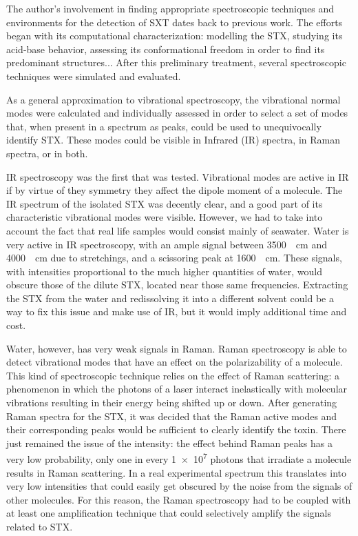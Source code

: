 The author's involvement in finding appropriate spectroscopic techniques and environments for the detection of SXT dates back to previous work.
The efforts began with its computational characterization: modelling the STX, studying its acid-base behavior, assessing its conformational freedom in order to find its predominant structures...
After this preliminary treatment, several spectroscopic techniques were simulated and evaluated.

As a general approximation to vibrational spectroscopy, the vibrational normal modes were calculated and individually assessed in order to select a set of modes that, when present in a spectrum as peaks, could be used to unequivocally identify STX.
These modes could be visible in Infrared (IR) spectra, in Raman spectra, or in both.

IR spectroscopy was the first that was tested.
Vibrational modes are active in IR if by virtue of they symmetry they affect the dipole moment of a molecule.
The IR spectrum of the isolated STX was decently clear, and a good part of its characteristic vibrational modes were visible.
However, we had to take into account the fact that real life samples would consist mainly of seawater.
Water is very active in IR spectroscopy, with an ample signal between \SI{3500}{\per\cm} and \SI{4000}{\per\cm} due to stretchings, and a scissoring peak at \SI{1600}{\per\cm}.
These signals, with intensities proportional to the much higher quantities of water, would obscure those of the dilute STX, located near those same frequencies.
Extracting the STX from the water and redissolving it into a different solvent could be a way to fix this issue and make use of IR, but it would imply additional time and cost.

Water, however, has very weak signals in Raman.
Raman spectroscopy is able to detect vibrational modes that have an effect on the polarizability of a molecule.
This kind of spectroscopic technique relies on the effect of Raman scattering: a phenomenon in which the photons of a laser interact inelastically with molecular vibrations resulting in their energy being shifted up or down.
After generating Raman spectra for the STX, it was decided that the Raman active modes and their corresponding peaks would be sufficient to clearly identify the toxin.
There just remained the issue of the intensity: the effect behind Raman peaks has a very low probability, only one in every \num{1e7} photons that irradiate a molecule results in Raman scattering.
In a real experimental spectrum this translates into very low intensities that could easily get obscured by the noise from the signals of other molecules.
For this reason, the Raman spectroscopy had to be coupled with at least one amplification technique that could selectively amplify the signals related to STX.

